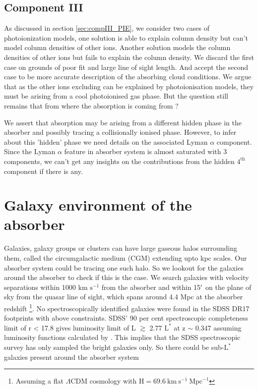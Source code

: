 \subsection{Component III}

As discussed in section \ref{sec:compIII_PIE}, we consider two cases of photoionization models, one solution is able to explain  column density but can't model column densities of other ions. Another solution models the column densities of other ions but fails to explain the  column density. We discard the first case on grounds of poor fit and large line of sight length. And accept the second case to be more accurate description of the absorbing cloud conditions. We argue that as the other ions excluding  can be explained by photoionisation models, they must be arising from a cool photoionised gas phase. But the question still remains that from where the  absorption is coming from ?  

We assert that  absorption may be arising from a different hidden phase in the absorber and possibly tracing a collisionally ionised phase. However, to infer about this 'hidden' phase we need details on the associated Lyman $\alpha$ component. Since the Lyman $\alpha$ feature in absorber system is almost saturated with 3 components, we can't get any insights on the contributions from the hidden $\text{4}^{\text{th}}$ component if there is any.    

\section{Galaxy environment of the absorber}

Galaxies, galaxy groups or clusters can have large gaseous halos surrounding them, called the circumgalactic medium (CGM) extending upto kpc scales. Our absorber system could be tracing one such halo. So we lookout for the galaxies around the absorber to check if this is the case. We search galaxies with velocity separations within 1000 km $\text{s}^{-1}$ from the absorber and within 15$\hbox{$^\prime$}$ on the plane of sky from the quasar line of sight, which spans around 4.4 Mpc at the absorber redshift \footnote{Assuming a flat $\Lambda$CDM cosmology with $\text{H}=69.6 \ \text{km} \ \text{s}^{-1} \ \text{Mpc}^{-1}$}. No spectroscopically identified galaxies were found in the SDSS DR17 \citep{SDSS_DR17} footprints with above constraints.  SDSS' 90 per cent spectroscopic completeness limit of r < 17.8 \citep{strauss_SDSS} gives luminosity limit of L $\gtrsim$ 2.77 $\text{L}^{*}$ at z $\sim$ 0.347 assuming luminosity functions calculated by \citet{ilbert_GLF}. This implies that the SDSS spectroscopic survey has only sampled the bright galaxies only. So there could be sub-$\text{L}^{*}$ galaxies present around the absorber system

